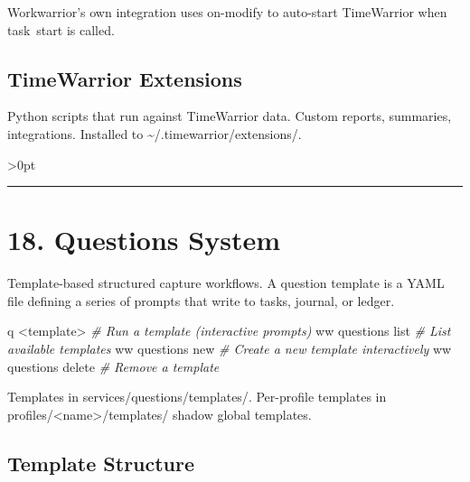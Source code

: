 \documentclass[11pt, a4paper, DIV=14]{scrartcl}
\renewcommand{\texttt}[1]{{\ttfamily\fontsize{8.5}{10.5}\selectfont\color{BabbNavy}#1}}
\newenvironment{Shaded}{%
  \vspace{4pt}%
  \begin{lrbox}{\ShadedBox}%
  \begin{minipage}{\dimexpr\linewidth-2\fboxsep\relax}%
  \vspace{4pt}%
}{%
  \vspace{4pt}%
  \end{minipage}%
  \end{lrbox}%
  \noindent\colorbox{CodeBg}{\usebox{\ShadedBox}}%
  \par\vspace{4pt}%
}
\newcommand{\CommentTok}[1]{\textcolor{BabbGray}{\textit{#1}}}
\newcommand{\ExtensionTok}[1]{#1}
\newcommand{\NormalTok}[1]{#1}
\newcommand{\OperatorTok}[1]{#1}
\newenvironment{Highlighting}{\ttfamily\fontsize{8.2}{11}\selectfont}{}
\let\origRule\rule
\renewcommand{\rule}[3][0pt]{%
  \ifnum\dimexpr#3\relax>0pt
    \par\vspace{2pt}\noindent{\color{BabbBorder}\origRule[#1]{#2}{#3}}\par\vspace{2pt}%
  \else
    \origRule[#1]{#2}{#3}%
  \fi
}
\begin{document}
Workwarrior's own integration uses \texttt{on-modify} to auto-start
TimeWarrior when \texttt{task\ start} is called.

\subsection{TimeWarrior Extensions}\label{timewarrior-extensions}

Python scripts that run against TimeWarrior data. Custom reports,
summaries, integrations. Installed to
\texttt{\textasciitilde{}/.timewarrior/extensions/}.

\begin{center}\rule{0.5\linewidth}{0.5pt}\end{center}

\section{18. Questions System}\label{questions-system}

Template-based structured capture workflows. A question template is a
YAML file defining a series of prompts that write to tasks, journal, or
ledger.

\begin{Shaded}
\begin{Highlighting}[]
\ExtensionTok{q} \OperatorTok{\textless{}}\NormalTok{template}\OperatorTok{\textgreater{}}            \CommentTok{\# Run a template (interactive prompts)}
\ExtensionTok{ww}\NormalTok{ questions list       }\CommentTok{\# List available templates}
\ExtensionTok{ww}\NormalTok{ questions new        }\CommentTok{\# Create a new template interactively}
\ExtensionTok{ww}\NormalTok{ questions delete     }\CommentTok{\# Remove a template}
\end{Highlighting}
\end{Shaded}

Templates in \texttt{services/questions/templates/}. Per-profile
templates in \texttt{profiles/\textless{}name\textgreater{}/templates/}
shadow global templates.

\subsection{Template Structure}\label{template-structure}
\end{document}
